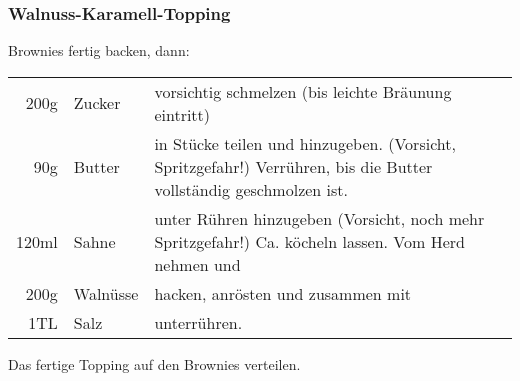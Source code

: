 \subsubsection{Walnuss-Karamell-Topping}
Brownies fertig backen, dann:\\

\begin{longtable}{rlL{17.9cm}}
	200g	&	Zucker		&	vorsichtig schmelzen (bis leichte Bräunung eintritt) \\
	90g		&	Butter		&	in Stücke teilen und hinzugeben. (Vorsicht, Spritzgefahr!)
								Verrühren, bis die Butter vollständig geschmolzen ist. \\
	120ml	&	Sahne		&	unter Rühren hinzugeben (Vorsicht, noch mehr Spritzgefahr!)
								Ca.  köcheln lassen. Vom Herd nehmen und \\
	200g	&	Walnüsse	&	hacken, anrösten und zusammen mit \\
	1TL		&	Salz		&	unterrühren. \\
\end{longtable}

Das fertige Topping auf den Brownies verteilen.